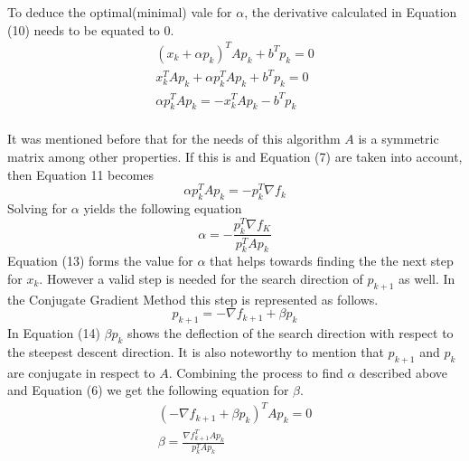 \documentclass[12pt,twosided]{article}
\begin{document}
To deduce the optimal(minimal) vale for $\alpha$, the derivative calculated in Equation (10) needs to be equated to 0.
\begin{equation}
\begin{split}
(x_k+\alpha p_k)^TAp_k+b^Tp_k=0\\
x_k^TAp_k+\alpha p_k^TAp_k+b^Tp_k=0\\
\alpha p_k^TAp_k=-x_k^TAp_k-b^Tp_k\\
\end{split}
\end{equation}

It was mentioned before that for the needs of this algorithm $A$ is a symmetric matrix among other properties. If this is and Equation (7) are taken into account, then Equation 11 becomes
\begin{equation}
\alpha p_k^TAp_k=-p_k^T\nabla f_k
\end{equation}
Solving for $\alpha$ yields the following equation
\begin{equation}
\alpha =-\frac{p_k^T\nabla f_K}{p_k^TAp_k}
\end{equation}
Equation (13) forms the value for $\alpha$ that helps towards finding the the next step for $x_k$. However a valid step is needed for the search direction of $p_{k+1}$ as well. In the Conjugate Gradient Method this step is represented as follows.
\begin{equation}
p_{k+1}=-\nabla f_{k+1}+\beta p_k
\end{equation}
In Equation (14) $\beta p_k$ shows the deflection of the search direction with respect to the steepest descent direction. It is also noteworthy to mention that $p_{k+1}$ and $p_k$ are conjugate in respect to $A$. Combining the process to find $\alpha$ described above and Equation (6) we get the following equation for $\beta$.
\begin{equation}
\begin{split}
(-\nabla f_{k+1}+\beta p_k)^TAp_k=0\\
\beta = \frac{\nabla f_{k+1}^TAp_k}{p_k^TAp_k}
\end{split}
\end{equation}
\end{document}
